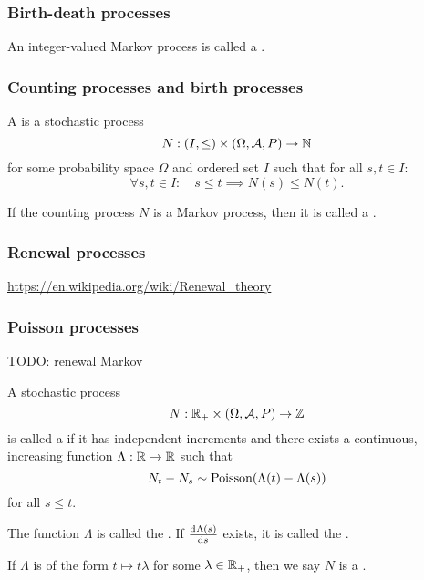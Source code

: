 \subsubsection{Birth-death processes}
\begin{definition}
An integer-valued Markov process is called a .
\end{definition}

\subsubsection{Counting processes and birth processes}
\begin{definition}
A  is a stochastic process
\[ N: \sSet{I,\leq}\times \sSet{\Omega, \mathcal{A}, P} \to \N \]
for some probability space $\Omega$ and ordered set $I$ such that for all $s,t\in I$:
\[ \forall s,t\in I: \quad s\leq t \implies N(s)\leq N(t). \]

If the counting process $N$ is a Markov process, then it is called a .
\end{definition}

\subsubsection{Renewal processes}
\url{https://en.wikipedia.org/wiki/Renewal_theory}

\subsubsection{Poisson processes}
TODO: renewal Markov
\begin{definition}
A stochastic process
\[ N: \R_+\times \sSet{\Omega, \mathcal{A}, P} \to \Z \]
is called a  if it has independent increments and there exists a continuous, increasing function $\Lambda: \mathbb{R}\to \mathbb{R}$ such that
\[ N_t - N_s \sim \operatorname{Poisson}(\Lambda(t) - \Lambda(s)) \]
for all $s\leq t$.

The function $\Lambda$ is called the . If $\od{\Lambda(s)}{s}$ exists, it is called the .

If $\Lambda$ is of the form $t\mapsto t\lambda$ for some $\lambda \in \mathbb{R}_+$, then we say $N$ is a .
\end{definition}

